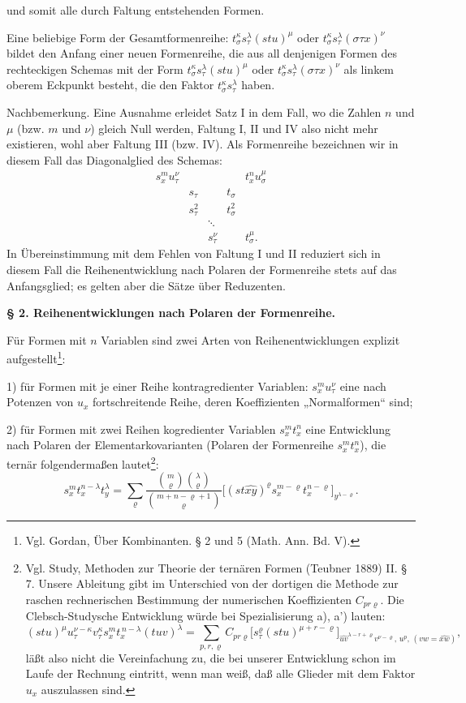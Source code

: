 \documentclass[11pt]{article}
\begin{document}
und somit alle durch Faltung entstehenden Formen.

Eine beliebige Form der Gesamtformenreihe: $t_\sigma^\kappa s_\tau^\lambda(stu)^\mu$ oder $t_\sigma^\kappa s_\tau^\lambda(\sigma\tau x)^\nu$ bildet den Anfang einer neuen Formenreihe, die aus all denjenigen Formen des rechteckigen Schemas mit der Form $t_\sigma^\kappa s_\tau^\lambda(stu)^\mu$ oder $t_\sigma^\kappa s_\tau^\lambda(\sigma\tau x)^\nu$ als linkem oberem Eckpunkt besteht, die den Faktor $t_\sigma^\kappa s_\tau^\lambda$ haben.

Nachbemerkung. Eine Ausnahme erleidet Satz I in dem Fall, wo die Zahlen $n$ und $\mu$ (bzw. $m$ und $\nu$) gleich Null werden, Faltung I, II und IV also nicht mehr existieren, wohl aber Faltung III (bzw. IV). Als Formenreihe bezeichnen wir in diesem Fall das Diagonalglied des Schemas:
\[
\begin{array}{ccccc}
s_x^m u_\tau^\nu &&&& t_x^n u_\sigma^\mu\\
& s_\tau && t_\sigma &\\
& s_\tau^2 && t_\sigma^2 &\\
&&\ddots&&\\
&&s_\tau^\nu && t_\sigma^\mu .
\end{array}
\]
In Übereinstimmung mit dem Fehlen von Faltung I und II reduziert sich in diesem Fall die Reihenentwicklung nach Polaren der Formenreihe stets auf das Anfangsglied; es gelten aber die Sätze über Reduzenten.

\begin{center}
\textbf{§ 2. \quad Reihenentwicklungen nach Polaren der Formenreihe.}
\end{center}

Für Formen mit $n$ Variablen sind zwei Arten von Reihenentwicklungen explizit aufgestellt\footnote{Vgl. Gordan, Über Kombinanten. § 2 und 5 (Math. Ann. Bd. V).}:

1) für Formen mit je einer Reihe kontragredienter Variablen: $s_x^m u_\tau^\nu$ eine nach Potenzen von $u_x$ fortschreitende Reihe, deren Koeffizienten „Normalformen“ sind;

2) für Formen mit zwei Reihen kogredienter Variablen $s_x^m t_x^n$ eine Entwicklung nach Polaren der Elementarkovarianten (Polaren der Formenreihe $s_x^m t_x^n$), die ternär folgendermaßen lautet\footnote{Vgl. Study, Methoden zur Theorie der ternären Formen (Teubner 1889) II. § 7. Unsere Ableitung gibt im Unterschied von der dortigen die Methode zur raschen rechnerischen Bestimmung der numerischen Koeffizienten $C_{pr\varrho}$. Die Clebsch-Studysche Entwicklung würde bei Spezialisierung a), a') lauten:
\[
(stu)^\mu u_\tau^{\nu-\kappa}v_\tau^\kappa s_x^m t_x^{\,n-\lambda}(tuv)^\lambda
=\sum_{p,r,\varrho} C_{pr\varrho}
\bigl[s_\tau^\varrho(stu)^{\mu+r-\varrho}\bigr]_{\widehat{uv}^{\lambda-r+\varrho}v^{\nu-\varrho},\,u^p,\,(vw=\widehat{xw})},
\]
läßt also nicht die Vereinfachung zu, die bei unserer Entwicklung schon im Laufe der Rechnung eintritt, wenn man weiß, daß alle Glieder mit dem Faktor $u_x$ auszulassen sind.}:
\[
\tag{I}
s_x^m t_x^{n-\lambda}t_y^\lambda
=\sum_{\varrho}
\frac{\binom{m}{\varrho}\binom{\lambda}{\varrho}}
{\binom{m+n-\varrho+1}{\varrho}}
\bigl[(st\widehat{xy})^\varrho s_x^{m-\varrho}t_x^{n-\varrho}\bigr]_{y^{\lambda-\varrho}}.
\]
\end{document}
